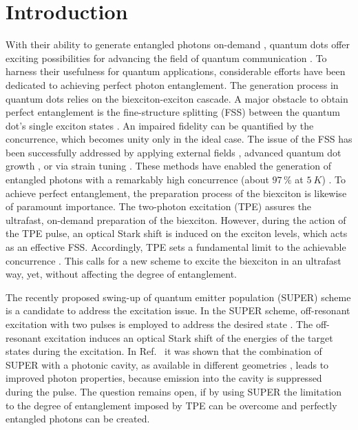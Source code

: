 \documentclass[%
 reprint,superscriptaddress,
 amsmath,amssymb,
 aps]{revtex4-2}
\begin{document}
\section{Introduction}
With their ability to generate entangled photons on-demand \cite{orieux2017semiconductor, stevenson2006semiconductor,Huber2018semiconductor}, quantum dots offer exciting possibilities for advancing the field of quantum communication \cite{vajner2022quantum}. To harness their usefulness for quantum applications, considerable efforts have been dedicated to achieving perfect photon entanglement. The generation process in quantum dots relies on the biexciton-exciton cascade. A major obstacle to obtain perfect entanglement is the fine-structure splitting (FSS) between the quantum dot's single exciton states \cite{hudson2007}. An impaired fidelity can be quantified by the concurrence, which becomes unity only in the ideal case. The issue of the FSS has been successfully addressed by applying external fields \cite{stevenson2006semiconductor,muller2009creating,bennett2010electricfield}, advanced quantum dot growth \cite{hafenbrak2007triggered,muller2014demand}, or via strain tuning \cite{trotta2014highly}. These methods have enabled the generation of entangled photons with a remarkably high concurrence (about $97\,\si{\percent}$ at $\SI{5}{K}$) \cite{huber2018strain}. To achieve perfect entanglement, the preparation process of the biexciton is likewise of paramount importance. The two-photon excitation (TPE) assures the ultrafast, on-demand preparation of the biexciton. However, during the action of the TPE pulse, an optical Stark shift is induced on the exciton levels, which acts as an effective FSS. Accordingly, TPE sets a fundamental limit to the achievable concurrence \cite{seidelmann2022two,basso2023}. This calls for a new scheme to excite the biexciton in an ultrafast way, yet, without affecting the degree of entanglement. 

The recently proposed swing-up of quantum emitter population (SUPER) scheme \cite{bracht21swingup} is a candidate to address the excitation issue.
In the SUPER scheme, off-resonant excitation with two pulses is employed to address the desired state  \cite{bracht21swingup,karli2022super,boos2022coherent}. The off-resonant excitation induces an optical Stark shift of the energies of the target states during the excitation. In Ref.~\cite{heinisch2023arxiv} it was shown that the combination of SUPER with a photonic cavity, as available in different geometries \cite{ota2011spontaneous,reitzenstein2010quantum,lodahl2015interfacing,wang2019ondemand,rickert2023high}, leads to improved photon properties, because emission into the cavity is suppressed during the pulse. The question remains open, if by using SUPER the limitation to the degree of entanglement imposed by TPE can be overcome and perfectly entangled photons can be created.
\end{document}

